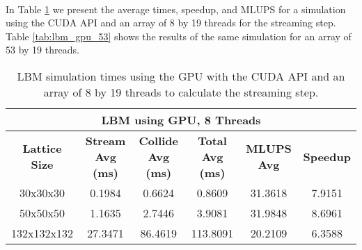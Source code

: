 \paragraph{}In Table \ref{tab:lbm_gpu_8} we present the average times, speedup, and MLUPS for a simulation using the CUDA API and an array of 8 by 19 threads for the streaming step. Table \ref{tab:lbm_gpu_53} shows the results of the same simulation for an array of 53 by 19 threads.


\begin{table}[htbp]
  \centering
    \begin{tabular}{|c|c|c|c|c|c|}
    \toprule
    \multicolumn{6}{c}{\textbf{LBM using GPU, 8 Threads}} \\
    \midrule
    \textbf{Lattice Size	} & \textbf{Stream Avg (ms)} &	\textbf{ Collide Avg (ms)} & \textbf{Total Avg (ms)} & \textbf{MLUPS Avg} &\textbf{Speedup}\\
    30x30x30	&0.1984&0.6624&0.8609&31.3618&	7.9151\\
	50x50x50&	1.1635&	2.7446&	3.9081&31.9848&8.6961\\
	132x132x132	&27.3471&86.4619&	113.8091&20.2109&6.3588\\
    \bottomrule
    \end{tabular}%
	\caption{LBM simulation times using the GPU with the CUDA API and an array of 8 by 19 threads to calculate the streaming step.}
	\label{tab:lbm_gpu_8}%
\end{table}%

